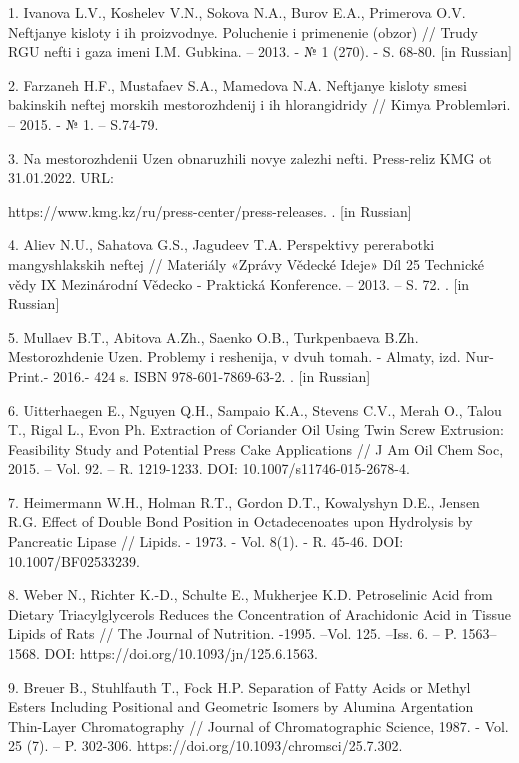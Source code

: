 \begin{noparindent}
1. Ivanova L.V., Koshelev V.N., Sokova N.A., Burov E.A., Primerova O.V.
Neftjanye kisloty i ih proizvodnye. Poluchenie i primenenie (obzor) //
Trudy RGU nefti i gaza imeni I.M. Gubkina. -- 2013. - № 1 (270). - S.
68-80. {[}in Russian{]}

2. Farzaneh H.F., Mustafaev S.A., Mamedova N.A. Neftjanye kisloty smesi
bakinskih neftej morskih mestorozhdenij i ih hlorangidridy // Kimya
Problemləri. -- 2015. - № 1. -- S.74-79.

3. Na mestorozhdenii Uzen\textquotesingle{} obnaruzhili novye zalezhi
nefti. Press-reliz KMG ot 31.01.2022. URL:

https://www.kmg.kz/ru/press-center/press-releases. . {[}in Russian{]}

4. Aliev N.U., Sahatova G.S., Jagudeev T.A. Perspektivy pererabotki
mangyshlakskih neftej // Materiály «Zprávy Vědecké Ideje» Díl 25
Technické vědy IX Mezinárodní Vědecko - Praktická Konference. -- 2013.
-- S. 72. . {[}in Russian{]}

5. Mullaev B.T., Abitova A.Zh., Saenko O.B., Turkpenbaeva B.Zh.
Mestorozhdenie Uzen\textquotesingle. Problemy i reshenija, v dvuh tomah.
- Almaty, izd. Nur-Print.- 2016.- 424 s. ISBN 978-601-7869-63-2. . {[}in
Russian{]}

6. Uitterhaegen E., Nguyen Q.H., Sampaio K.A., Stevens C.V., Merah O.,
Talou T., Rigal L., Evon Ph. Extraction of Coriander Oil Using Twin
Screw Extrusion: Feasibility Study and Potential Press Cake Applications
// J Am Oil Chem Soc, 2015. -- Vol. 92. -- R. 1219-1233. DOI:
10.1007/s11746-015-2678-4.

7. Heimermann W.H., Holman R.T., Gordon D.T., Kowalyshyn D.E., Jensen
R.G. Effect of Double Bond Position in Octadecenoates upon Hydrolysis by
Pancreatic Lipase // Lipids. - 1973. - Vol. 8(1). - R. 45-46. DOI:
10.1007/BF02533239.

8. Weber N., Richter K.-D., Schulte E., Mukherjee K.D. Petroselinic Acid
from Dietary Triacylglycerols Reduces the Concentration of Arachidonic
Acid in Tissue Lipids of Rats // The Journal of Nutrition. -1995. --Vol.
125. --Iss. 6. -- P. 1563--1568. DOI:
https://doi.org/10.1093/jn/125.6.1563.

9. Breuer B., Stuhlfauth T., Fock H.P. Separation of Fatty Acids or
Methyl Esters Including Positional and Geometric Isomers by Alumina
Argentation Thin-Layer Chromatography // Journal of Chromatographic
Science, 1987. - Vol. 25 (7). -- P. 302-306.
https://doi.org/10.1093/chromsci/25.7.302.


\end{noparindent}
